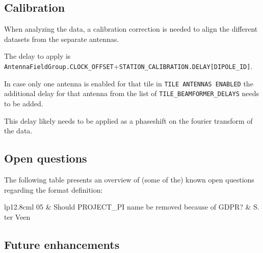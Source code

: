 \documentclass[a4paper,10pt,bibtotoc]{scrartcl}
\begin{document}
\subsection{Calibration}
When analyzing the data, a calibration correction is needed to align the different datasets from the separate antennas.

The delay to apply is \verb|AntennaFieldGroup.CLOCK_OFFSET|+\verb|STATION_CALIBRATION.DELAY[DIPOLE_ID]|.

In case only one antenna is enabled for that tile in \verb|TILE ANTENNAS ENABLED| the additional delay for that antenna from the list of \verb|TILE_BEAMFORMER_DELAYS| needs to be added.

This delay likely needs to be applied as a phaseshift on the fourier transform of the data.



\subsection{Open questions}

The following table presents an overview of (some of the) known open
questions regarding the format definition:

\begin{center}
  \tablelasttail{\hline}
  \begin{supertabular}{lp{12.8cm}l}
    05 & Should PROJECT\_PI name be removed because of GDPR? & S. ter Veen \\
 \end{supertabular}
\end{center}

\subsection{Future enhancements}
\end{document}
